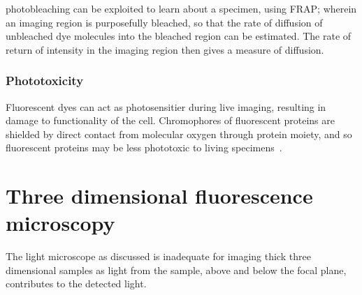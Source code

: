 
\Gls{photobleaching} can be exploited to learn about a specimen, using \gls{FRAP}; wherein an imaging region is purposefully bleached, so that the rate of diffusion of unbleached dye molecules into the bleached region can be estimated.
The rate of return of intensity in the imaging region then gives a measure of diffusion.


\subsubsection{Phototoxicity}

Fluorescent dyes can act as \gls{photosensitier} during live imaging, resulting in damage to functionality of the cell.
Chromophores of fluorescent proteins are shielded by direct contact from molecular oxygen through protein moiety, and so fluorescent proteins may be less phototoxic to living specimens~\cite{pawleyHandbookBiologicalConfocal2006}.


\section{Three dimensional fluorescence microscopy}

The light microscope as discussed is inadequate for imaging thick three dimensional samples as light from the sample, above and below the focal plane, contributes to the detected light.

